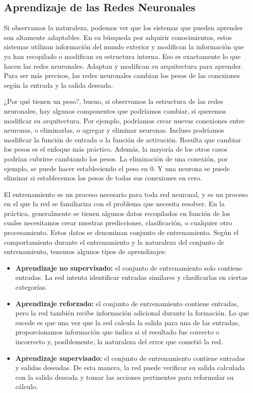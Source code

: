 \documentclass[12pt, a4paper, titlepage]{report}
\begin{document}
				\subsection{Aprendizaje de las Redes Neuronales}
				Si observamos la naturaleza, podemos ver que los sistemas que pueden aprender son altamente adaptables. En su búsqueda por adquirir conocimientos, estos sistemas utilizan información del mundo exterior y modifican la información que ya han recopilado o modifican su estructura interna. Eso es exactamente lo que hacen las redes neuronales. Adaptan y modifican su arquitectura para aprender. Para ser más precisos, las redes neuronales cambian los pesos de las conexiones según la entrada y la salida deseada.\par
				¿Por qué tienen un peso?, bueno, si observamos la estructura de las redes neuronales, hay algunos componentes que podríamos cambiar, si queremos modificar su arquitectura. Por ejemplo, podríamos crear nuevas conexiones entre neuronas, o eliminarlas, o agregar y eliminar neuronas. Incluso podríamos modificar la función de entrada o la función de activación. Resulta que cambiar los pesos es el enfoque más práctico. Además, la mayoría de los otros casos podrían cubrirse cambiando los pesos. La eliminación de una conexión, por ejemplo, se puede hacer estableciendo el peso en 0. Y una neurona se puede eliminar si establecemos los pesos de todas sus conexiones en cero.\cite{refAprendizajeRedes}\par
				El entrenamiento es un proceso necesario para toda red neuronal, y es un proceso en el que la red se familiariza con el problema que necesita resolver. En la práctica, generalmente se tienen algunos datos recopilados en función de los cuales necesitamos crear nuestras predicciones, clasificación, o cualquier otro procesamiento. Estos datos se denominan conjunto de entrenamiento. Según el comportamiento durante el entrenamiento y la naturaleza del conjunto de entrenamiento, tenemos algunos tipos de aprendizajes:
				\begin{itemize}
					\item \textbf{Aprendizaje no supervisado: }el conjunto de entrenamiento solo contiene entradas. La red intenta identificar entradas similares y clasificarlas en ciertas categorías.
					\item \textbf{Aprendizaje reforzado: }el conjunto de entrenamiento contiene entradas, pero la red también recibe información adicional durante la formación. Lo que sucede es que una vez que la red calcula la salida para una de las entradas, proporcionamos información que indica si el resultado fue correcto o incorrecto y, posiblemente, la naturaleza del error que cometió la red.
					\item \textbf{Aprendizaje supervisado: }el conjunto de entrenamiento contiene entradas y salidas deseadas. De esta manera, la red puede verificar su salida calculada con la salida deseada y tomar las acciones pertinentes para reformular su cálculo.
				\end{itemize}
\end{document}
